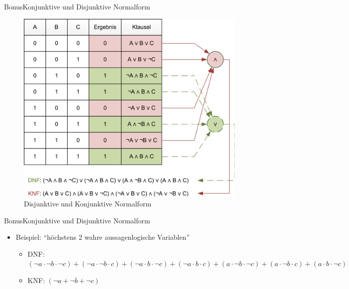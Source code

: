 \begin{frame}{Bonus}{Konjunktive und Disjunktive Normalform}
  \begin{figure}
    \includegraphics[height=0.6\textheight, center]{./figures/knf_dnf.png}
    \caption{Disjunktive und Konjunktive Normalform \cite{noauthor_disjunktive_2023}}
  \end{figure}
\end{frame}

\begin{frame}{Bonus}{Konjunktive und Disjunktive Normalform}
  \begin{itemize}
    \item \alert{Beispiel:} \enquote{\alert{höchstens} 2 wahre aussagenlogische Variablen}
    \begin{itemize}
      \item \alert{DNF:} $(\neg a\cdot \neg b\cdot \neg c)+(\neg a\cdot \neg b\cdot c)+(\neg a\cdot b\cdot \neg c)+(\neg a\cdot b\cdot c)+(a\cdot \neg b\cdot \neg c)+(a\cdot \neg b\cdot c)+(a\cdot b\cdot \neg c)$
      \item \alert{KNF:} $(\neg a+\neg b+\neg c)$
    \end{itemize}
  \end{itemize}
\end{frame}
